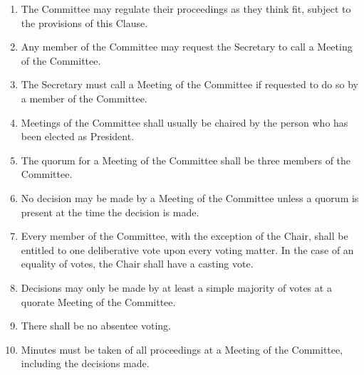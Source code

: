 \documentclass[12pt]{constitution}
\begin{document}
\label{clause:meetings-committee}

\begin{enumerate}
    \item The Committee may regulate their proceedings as they think fit, subject to the provisions of this Clause.
    \item Any member of the Committee may request the Secretary to call a Meeting of the Committee.
    \item The Secretary must call a Meeting of the Committee if requested to do so by a member of the Committee.
    \item Meetings of the Committee shall usually be chaired by the person who has been elected as President.
    \item The quorum for a Meeting of the Committee shall be three members of the Committee.
    \item No decision may be made by a Meeting of the Committee unless a quorum is present at the time the decision is made.
    \item Every member of the Committee, with the exception of the Chair, shall be entitled to one deliberative vote upon every voting matter. In the case of an equality of votes, the Chair shall have a casting vote.
    \item Decisions may only be made by at least a simple majority of votes at a quorate Meeting of the Committee.
    \item There shall be no absentee voting.
    \item Minutes must be taken of all proceedings at a Meeting of the Committee, including the decisions made.
\end{enumerate}


\label{clause:appointment-committee}
\end{document}
